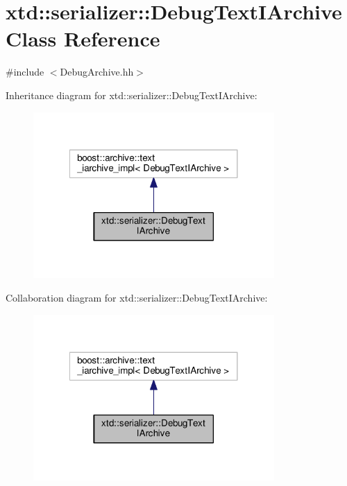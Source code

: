 \hypertarget{classxtd_1_1serializer_1_1DebugTextIArchive}{\section{xtd\-:\-:serializer\-:\-:Debug\-Text\-I\-Archive Class Reference}
\label{classxtd_1_1serializer_1_1DebugTextIArchive}
}


{\ttfamily \#include $<$Debug\-Archive.\-hh$>$}



Inheritance diagram for xtd\-:\-:serializer\-:\-:Debug\-Text\-I\-Archive\-:
\nopagebreak
\begin{figure}[H]
\begin{center}
\leavevmode
\includegraphics[width=260pt]{classxtd_1_1serializer_1_1DebugTextIArchive__inherit__graph}
\end{center}
\end{figure}


Collaboration diagram for xtd\-:\-:serializer\-:\-:Debug\-Text\-I\-Archive\-:
\nopagebreak
\begin{figure}[H]
\begin{center}
\leavevmode
\includegraphics[width=260pt]{classxtd_1_1serializer_1_1DebugTextIArchive__coll__graph}
\end{center}
\end{figure}
